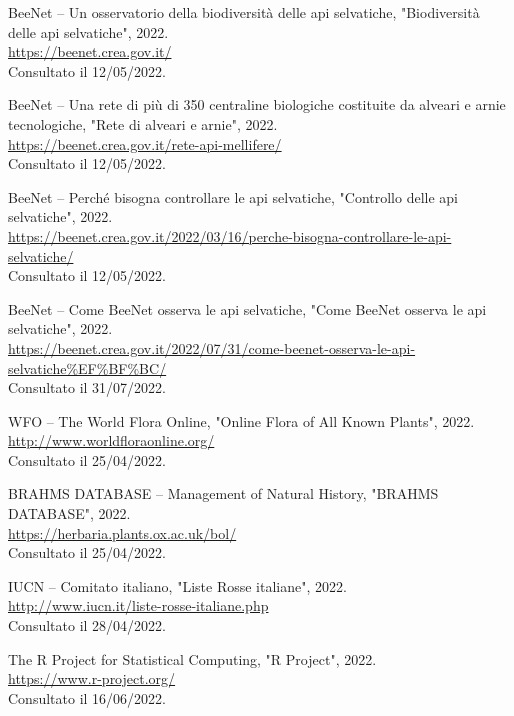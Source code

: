 \documentclass[main.tex]{subfiles}
\begin{document}
\bigskip

BeeNet – Un osservatorio della biodiversità delle api selvatiche, "Biodiversit{\`a} delle api selvatiche", 2022. \\
\href{https://beenet.crea.gov.it/}{https://beenet.crea.gov.it/}\\
Consultato il 12/05/2022.

\bigskip

BeeNet – Una rete di più di 350 centraline biologiche  costituite da alveari e arnie tecnologiche, "Rete di alveari e arnie", 2022. \\
\href{https://beenet.crea.gov.it/rete-api-mellifere/}{https://beenet.crea.gov.it/rete-api-mellifere/}\\
Consultato il 12/05/2022.

\bigskip

BeeNet – Perché bisogna controllare le api selvatiche, "Controllo delle api selvatiche", 2022. \\
\href{https://beenet.crea.gov.it/2022/03/16/perche-bisogna-controllare-le-api-selvatiche/}{https://beenet.crea.gov.it/2022/03/16/perche-bisogna-controllare-le-api-selvatiche/}\\
Consultato il 12/05/2022.

\bigskip

BeeNet – Come BeeNet osserva le api selvatiche, "Come BeeNet osserva le api selvatiche", 2022. \\
\href{https://beenet.crea.gov.it/2022/07/31/come-beenet-osserva-le-api-selvatiche\%EF\%BF\%BC/}{https://beenet.crea.gov.it/2022/07/31/come-beenet-osserva-le-api-selvatiche\%EF\%BF\%BC/}\\
Consultato il 31/07/2022.

\bigskip

WFO – The World Flora Online, "Online Flora of All Known Plants", 2022. \\
\href{http://www.worldfloraonline.org/}{http://www.worldfloraonline.org/}\\
Consultato il 25/04/2022.

\bigskip

BRAHMS DATABASE – Management of Natural History, "BRAHMS DATABASE", 2022. \\
\href{https://herbaria.plants.ox.ac.uk/bol/}{https://herbaria.plants.ox.ac.uk/bol/}\\
Consultato il 25/04/2022.

\bigskip

IUCN – Comitato italiano, "Liste Rosse italiane", 2022. \\
\href{http://www.iucn.it/liste-rosse-italiane.php}{http://www.iucn.it/liste-rosse-italiane.php}\\
Consultato il 28/04/2022.

\bigskip

The R Project for Statistical Computing, "R Project", 2022. \\
\href{https://www.r-project.org/}{https://www.r-project.org/}\\
Consultato il 16/06/2022.

\clearpage
\end{document}
